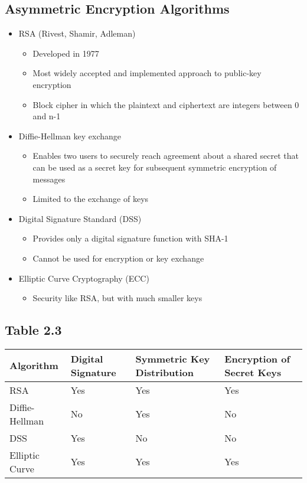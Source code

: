 \documentclass[11pt]{article}
\begin{document}
\subsection{Asymmetric Encryption Algorithms}
\label{sec:orgf411ed8}
\begin{itemize}
\item RSA (Rivest, Shamir, Adleman)
\begin{itemize}
\item Developed in 1977
\item Most widely accepted and implemented approach to public-key encryption
\item Block cipher in which the plaintext and ciphertext are integers between 0 and n-1
\end{itemize}
\item Diffie-Hellman key exchange
\begin{itemize}
\item Enables two users to securely reach agreement about a shared secret that can be used as a secret key for subsequent symmetric encryption of messages
\item Limited to the exchange of keys
\end{itemize}
\item Digital Signature Standard (DSS)
\begin{itemize}
\item Provides only a digital signature function with SHA-1
\item Cannot be used for encryption or key exchange
\end{itemize}
\item Elliptic Curve Cryptography (ECC)
\begin{itemize}
\item Security like RSA, but with much smaller keys
\end{itemize}
\end{itemize}
\subsection{Table 2.3}
\label{sec:orge77a887}
\begin{center}
\begin{tabular}{llll}
Algorithm & Digital Signature & Symmetric Key Distribution & Encryption of Secret Keys\\
\hline
RSA & Yes & Yes & Yes\\
Diffie-Hellman & No & Yes & No\\
DSS & Yes & No & No\\
Elliptic Curve & Yes & Yes & Yes\\
\end{tabular}
\end{center}
\end{document}
